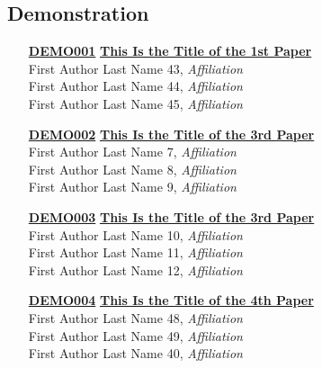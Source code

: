 \subsection{Demonstration}
\begin{enumerate}
\item[\href{https://doi.org/10.1145/1111111.1111124}{\textbf{DEMO001}}]
\href{https://doi.org/10.1145/1111111.1111124}{\textbf{This Is the Title of the 1st Paper}}\\
First Author Last Name 43, \emph{Affiliation}\\
First Author Last Name 44, \emph{Affiliation}\\
First Author Last Name 45, \emph{Affiliation}\\

\item[\href{https://doi.org/10.1145/1111111.1111125}{\textbf{DEMO002}}]
\href{https://doi.org/10.1145/1111111.1111125}{\textbf{This Is the Title of the 3rd Paper}}\\
First Author Last Name 7, \emph{Affiliation}\\
First Author Last Name 8, \emph{Affiliation}\\
First Author Last Name 9, \emph{Affiliation}\\

\item[\href{https://doi.org/10.1145/1111111.1111126}{\textbf{DEMO003}}]
\href{https://doi.org/10.1145/1111111.1111126}{\textbf{This Is the Title of the 3rd Paper}}\\
First Author Last Name 10, \emph{Affiliation}\\
First Author Last Name 11, \emph{Affiliation}\\
First Author Last Name 12, \emph{Affiliation}\\

\item[\href{https://doi.org/10.1145/1111111.1111127}{\textbf{DEMO004}}]
\href{https://doi.org/10.1145/1111111.1111127}{\textbf{This Is the Title of the 4th Paper}}\\
First Author Last Name 48, \emph{Affiliation}\\
First Author Last Name 49, \emph{Affiliation}\\
First Author Last Name 40, \emph{Affiliation}\\
\end{enumerate}


